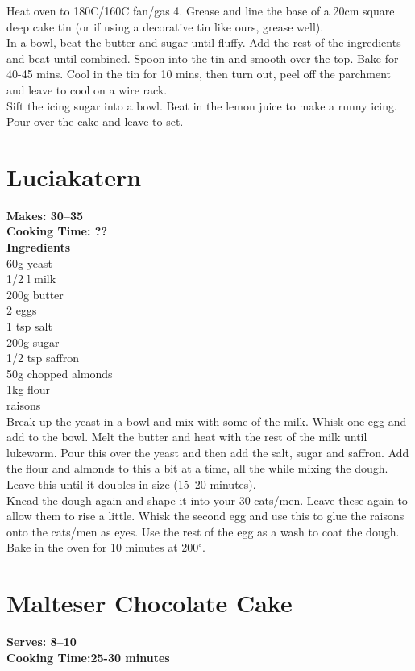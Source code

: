 \documentclass[18pt, oneside]{book}
\begin{document}
Heat oven to 180C/160C fan/gas 4. Grease and line the base of a 20cm square deep cake tin (or if using a decorative tin like ours, grease well). \\

In a bowl, beat the butter and sugar until fluffy. Add the rest of the ingredients and beat until combined. Spoon into the tin and smooth over the top. Bake for 40-45 mins. Cool in the tin for 10 mins, then turn out, peel off the parchment and leave to cool on a wire rack. \\

Sift the icing sugar into a bowl. Beat in the lemon juice to make a runny icing. Pour over the cake and leave to set. \\

\section{Luciakatern}
\textbf{Makes: 30--35} \\
\textbf{Cooking Time: ??} \\

\textbf{Ingredients}  \\
60g yeast\\
1/2 l milk \\
200g butter \\
2 eggs\\
1 tsp salt \\
200g sugar \\
1/2 tsp saffron \\
50g chopped almonds \\
1kg flour \\
raisons \\

Break up the yeast in a bowl and mix with some of the milk. Whisk one egg and add to the bowl. Melt the butter and heat with the rest of the milk until lukewarm. Pour this over the yeast and then add the salt, sugar and saffron. Add the flour and almonds to this a bit at a time, all the while mixing the dough. Leave this until it doubles in size (15--20 minutes). \\

Knead the dough again and shape it into your 30 cats/men.  Leave these again to allow them to rise a little. Whisk the second egg and use this to glue the raisons onto the cats/men as eyes. Use the rest of the egg as a wash to coat the dough. Bake in the oven for 10 minutes at 200$^{\circ}$. 

\section{Malteser Chocolate Cake}
\textbf{Serves: 8--10} \\
\textbf{Cooking Time:25-30 minutes} \\
\end{document}
